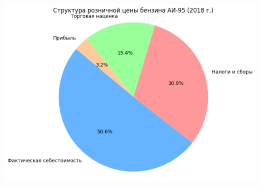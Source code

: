 \documentclass[a4paper,12pt]{article}
\begin{document}
\includegraphics[scale=0.4]{graphs/5.4.png}
\end{document}
